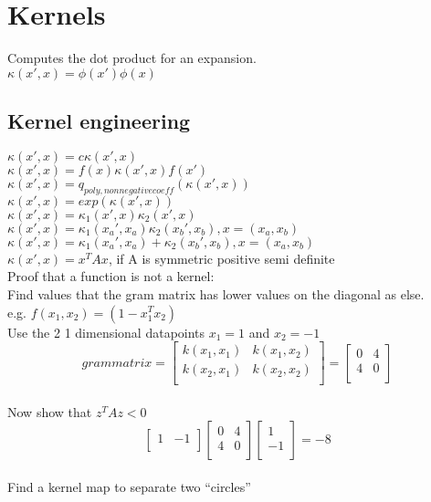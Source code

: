 \section{Kernels}
Computes the dot product for an expansion.\\ $\kappa(x', x) = \phi(x') \phi(x)$\\
\subsection{Kernel
engineering}
$\kappa(x', x) = c\kappa(x', x)$\\ $\kappa(x', x) = f(x)\kappa(x', x)f(x')$\\ $\kappa
(x', x) =q_{poly, non negative coeff}(\kappa(x', x))$\\
$\kappa(x', x) = exp(\kappa(x', x))$\\ $\kappa(x', x) =\kappa_{1}(x', x)\kappa_{2}
(x', x)$\\
$\kappa(x', x) =\kappa_{1}(x_{a}', x_{a})\kappa_{2}(x_{b}', x_{b}), x = (x_{a}, x
_{b})$\\ $\kappa(x', x) =\kappa_{1}(x_{a}', x_{a})+\kappa_{2}(x_{b}', x_{b}), x =
(x_{a}, x_{b})$\\ $\kappa(x', x) =x^{T}Ax$, if A is symmetric positive semi definite\\
Proof that a function is not a kernel:\\ Find values that the gram matrix has
lower values on the diagonal as else.\\ e.g. $f(x_{1}, x_{2})=(1-x_{1}^{T}x_{2})$\\
Use the 2 1 dimensional datapoints $x_{1}=1$ and $x_{2}=-1$\\
\[
	grammatrix = \left[
	\begin{matrix}
		k(x_{1},x_{1}) & k(x_{1},x_{2}) \\
		k(x_{2},x_{1}) & k(x_{2},x_{2}) \\
	\end{matrix}\right] = \left[
	\begin{matrix}
		0 & 4 \\
		4 & 0 \\
	\end{matrix}\right]
\]\\ Now show that $z^{T}Az < 0$
\[
	\left[
	\begin{matrix}
		1 & -1 \\
	\end{matrix}\right] \left[
	\begin{matrix}
		0 & 4 \\
		4 & 0 \\
	\end{matrix}\right] \left[
	\begin{matrix}
		1  \\
		-1 \\
	\end{matrix}\right] = -8
\]\\ Find a kernel map to separate two \enquote{circles}\\
